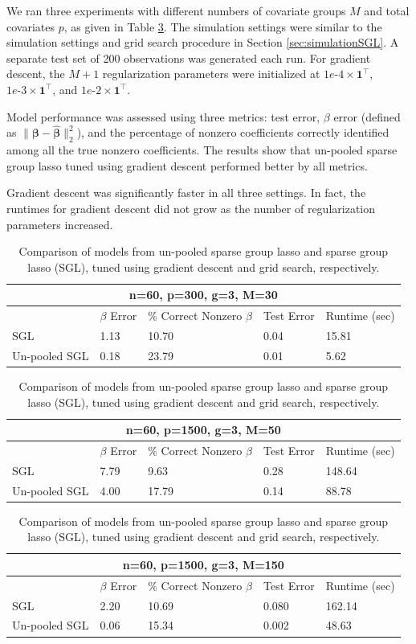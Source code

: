 \documentclass[12pt,letterpaper]{article}
\begin{document}
We ran three experiments with different numbers of covariate groups $M$ and total covariates $p$, as given in Table \ref{table:unpooled}. The simulation settings were similar to the simulation settings and grid search procedure in Section \ref{sec:simulationSGL}. A separate test set of 200 observations was generated each run. For gradient descent, the $M+1$ regularization parameters were initialized at $1e\text{-}4 \times \boldsymbol 1^\top$, $1e\text{-}3 \times \boldsymbol 1^\top$, and $1e\text{-}2 \times \boldsymbol 1^\top$.

Model performance was assessed using three metrics: test error, $\beta$ error (defined as $\| \boldsymbol \beta - \hat {\boldsymbol \beta} \|_2 ^2$), and the percentage of nonzero coefficients correctly identified among all the true nonzero coefficients. The results show that un-pooled sparse group lasso tuned using gradient descent performed better by all metrics.

Gradient descent was significantly faster in all three settings. In fact, the runtimes for gradient descent did not grow as the number of regularization parameters increased.

\begin{table}
\begin{center}
\begin{tabular}{| l | l | l | l | l | }
\hline
\multicolumn{5}{|c|}{n=60, p=300, g=3, M=30}\\
\hline
 & $\beta$ Error & \% Correct Nonzero $\beta$ & Test Error & Runtime (sec) \\
\hline
SGL & 1.13 & 10.70 & 0.04 & 15.81 \\
\hline
Un-pooled SGL & 0.18 & 23.79 & 0.01 & 5.62 \\
\hline
\end{tabular}

\begin{tabular}{| l | l | l | l | l | }
\hline
\multicolumn{5}{|c|}{n=60, p=1500, g=3, M=50}\\
\hline
 & $\beta$ Error & \% Correct Nonzero $\beta$ & Test Error & Runtime (sec) \\
\hline
SGL & 7.79 & 9.63 & 0.28 & 148.64 \\
\hline
Un-pooled SGL & 4.00 & 17.79 & 0.14 & 88.78 \\
\hline
\end{tabular}

\begin{tabular}{| l | l | l | l | l | }
\hline
\multicolumn{5}{|c|}{n=60, p=1500, g=3, M=150}\\
\hline
 & $\beta$ Error & \% Correct Nonzero $\beta$ & Test Error & Runtime (sec) \\
\hline
SGL & 2.20 & 10.69 & 0.080 & 162.14 \\
\hline
Un-pooled SGL & 0.06 & 15.34 & 0.002 & 48.63 \\
\hline
\end{tabular}
\end{center}
\caption {Comparison of models from un-pooled sparse group lasso and sparse group lasso (SGL), tuned using gradient descent and grid search, respectively.}
\label{table:unpooled}
\end{table}
\end{document}
